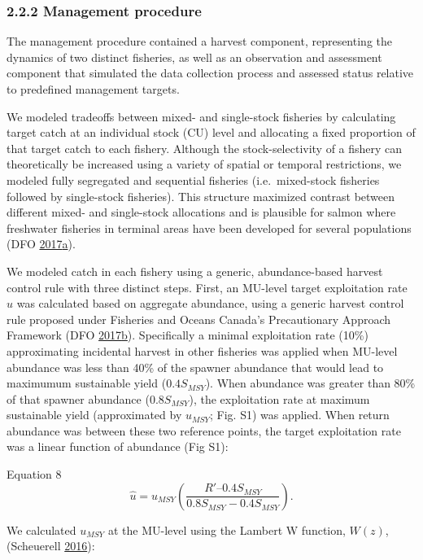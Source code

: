 \documentclass[11pt]{book}
\begin{document}
\subsubsection{2.2.2 Management procedure}\label{management-procedure}

The management procedure contained a harvest component, representing the dynamics of two distinct fisheries, as well as an observation and assessment component that simulated the data collection process and assessed status relative to predefined management targets.

We modeled tradeoffs between mixed- and single-stock fisheries by calculating target catch at an individual stock (CU) level and allocating a fixed proportion of that target catch to each fishery. Although the stock-selectivity of a fishery can theoretically be increased using a variety of spatial or temporal restrictions, we modeled fully segregated and sequential fisheries (i.e.~mixed-stock fisheries followed by single-stock fisheries). This structure maximized contrast between different mixed- and single-stock allocations and is plausible for salmon where freshwater fisheries in terminal areas have been developed for several populations (DFO \protect\hyperlink{ref-DFO2017a}{2017}\protect\hyperlink{ref-DFO2017a}{a}).

We modeled catch in each fishery using a generic, abundance-based harvest control rule with three distinct steps. First, an MU-level target exploitation rate \(\hat{u}\) was calculated based on aggregate abundance, using a generic harvest control rule proposed under Fisheries and Oceans Canada's Precautionary Approach Framework (DFO \protect\hyperlink{ref-DFO2017b}{2017}\protect\hyperlink{ref-DFO2017b}{b}). Specifically a minimal exploitation rate (10\%) approximating incidental harvest in other fisheries was applied when MU-level abundance was less than 40\% of the spawner abundance that would lead to maximumum sustainable yield (\(0.4{S}_{MSY}\)). When abundance was greater than 80\% of that spawner abundance (\(0.8{S}_{MSY}\)), the exploitation rate at maximum sustainable yield (approximated by \({u}_{MSY}\); Fig. S1) was applied. When return abundance was between these two reference points, the target exploitation rate was a linear function of abundance (Fig S1):

Equation 8 \[ \hat{u} = {u}_{MSY}({\frac{R' – 0.4{S}_{MSY}} {0.8{S}_{MSY} − 0.4{S}_{MSY}}}).\]

We calculated \({u}_{MSY}\) at the MU-level using the Lambert W function, \(W(z)\), (Scheuerell \protect\hyperlink{ref-Scheuerell2016}{2016}):
\end{document}
